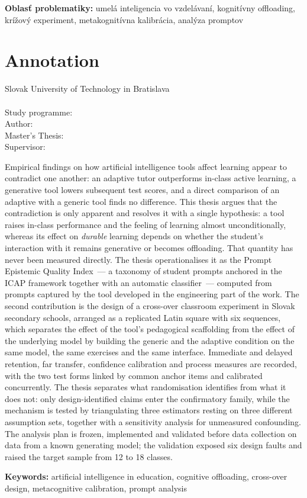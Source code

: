 \vspace{6pt}
\textbf{Oblasť problematiky:} umelá inteligencia vo vzdelávaní, kognitívny offloading, krížový experiment, metakognitívna kalibrácia, analýza promptov


\vfill
\section*{Annotation}

Slovak University of Technology in Bratislava \\
\myFaculty \\[4pt]
Study programme: \myStudyProgram \\
Author: \myName \\
Master's Thesis: \myTitle \\
Supervisor: \mySupervisor \\
\myDate

\vspace{8pt}

Empirical findings on how artificial intelligence tools affect learning appear to contradict one another: an adaptive tutor outperforms in-class active learning, a generative tool lowers subsequent test scores, and a direct comparison of an adaptive with a generic tool finds no difference. This thesis argues that the contradiction is only apparent and resolves it with a single hypothesis: a tool raises in-class performance and the feeling of learning almost unconditionally, whereas its effect on \emph{durable} learning depends on whether the student's interaction with it remains generative or becomes offloading. That quantity has never been measured directly. The thesis operationalises it as the Prompt Epistemic Quality Index~--- a taxonomy of student prompts anchored in the ICAP framework together with an automatic classifier~--- computed from prompts captured by the tool developed in the engineering part of the work. The second contribution is the design of a cross-over classroom experiment in Slovak secondary schools, arranged as a replicated Latin square with six sequences, which separates the effect of the tool's pedagogical scaffolding from the effect of the underlying model by building the generic and the adaptive condition on the same model, the same exercises and the same interface. Immediate and delayed retention, far transfer, confidence calibration and process measures are recorded, with the two test forms linked by common anchor items and calibrated concurrently. The thesis separates what randomisation identifies from what it does not: only design-identified claims enter the confirmatory family, while the mechanism is tested by triangulating three estimators resting on three different assumption sets, together with a sensitivity analysis for unmeasured confounding. The analysis plan is frozen, implemented and validated before data collection on data from a known generating model; the validation exposed six design faults and raised the target sample from 12 to 18 classes.

\vspace{6pt}
\textbf{Keywords:} artificial intelligence in education, cognitive offloading, cross-over design, metacognitive calibration, prompt analysis

